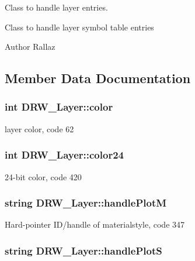 Class to handle layer entries. 

Class to handle layer symbol table entries \begin{DoxyAuthor}{Author}
Rallaz 
\end{DoxyAuthor}


\subsection{Member Data Documentation}
\hypertarget{classDRW__Layer_a9493b013d49446be87a1021086f7e17c}{
\subsubsection[{color}]{\setlength{\rightskip}{0pt plus 5cm}int D\-R\-W\-\_\-\-Layer\-::color}}\label{classDRW__Layer_a9493b013d49446be87a1021086f7e17c}
layer color, code 62 \hypertarget{classDRW__Layer_a20e31ea14b3aff0194d862f06299fc98}{
\subsubsection[{color24}]{\setlength{\rightskip}{0pt plus 5cm}int D\-R\-W\-\_\-\-Layer\-::color24}}\label{classDRW__Layer_a20e31ea14b3aff0194d862f06299fc98}
24-\/bit color, code 420 \hypertarget{classDRW__Layer_a53a312ef0cbe60de6ec14d8633cf79e2}{
\subsubsection[{handle\-Plot\-M}]{\setlength{\rightskip}{0pt plus 5cm}string D\-R\-W\-\_\-\-Layer\-::handle\-Plot\-M}}\label{classDRW__Layer_a53a312ef0cbe60de6ec14d8633cf79e2}
Hard-\/pointer I\-D/handle of materialstyle, code 347 \hypertarget{classDRW__Layer_ae8b9697b614d6a23d82d44793ed70ecd}{
\subsubsection[{handle\-Plot\-S}]{\setlength{\rightskip}{0pt plus 5cm}string D\-R\-W\-\_\-\-Layer\-::handle\-Plot\-S}}\label{classDRW__Layer_ae8b9697b614d6a23d82d44793ed70ecd}
